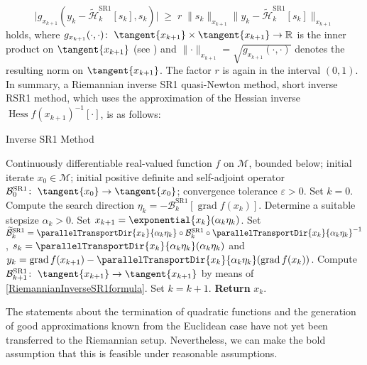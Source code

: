\begin{equation}\label{RiemannianCautiousSR1}
    \lvert g_{x_{k+1}}(y_k - \widetilde{\mathcal{H}}^\mathrm{SR1}_k [s_k], s_k) \lvert \; \geq \; r \; \lVert s_k \rVert_{x_{k+1}} \lVert y_k - \widetilde{\mathcal{H}}^\mathrm{SR1}_k [s_k] \rVert_{x_{k+1}} 
\end{equation}
holds, where $g_{x_{k+1}}(\cdot, \cdot) \colon \; \tangent{x_{k+1}} \times \tangent{x_{k+1}} \to \mathbb{R}$ is the inner product on $\tangent{x_{k+1}}$ (see \cite[p.~6]{BergmannHerzogLouzeiroSilvaTenbrinckVidalNunez:2020:1}) and $ \lVert \cdot \rVert_{x_{k+1}} = \sqrt{g_{x_{k+1}}(\cdot, \cdot)}$ denotes the resulting norm on $\tangent{x_{k+1}}$. The factor $r$ is again in the interval $(0,1)$. \\
In summary, a Riemannian inverse SR1 quasi-Newton method, short inverse RSR1 method, which uses the approximation of the Hessian inverse ${\operatorname{Hess} f(x_{k+1})}^{-1} [\cdot]$, is as follows:
\begin{algorithm}[H]
    \caption{Inverse SR1 Method}\label{RiemannianSR1Method}
    \begin{algorithmic}[1]
        \State Continuously differentiable real-valued function $f$ on $\mathcal{M}$, bounded below; initial iterate $x_0 \in \mathcal{M}$; initial positive definite and self-adjoint operator $\mathcal{B}^{\mathrm{SR1}}_0 \colon \; \tangent{x_0} \to \tangent{x_0}$; convergence tolerance $\varepsilon > 0$. Set $k = 0$.
            \State Compute the search direction $\eta_k = - \mathcal{B}^{\mathrm{SR1}}_k [\operatorname{grad} f(x_k)]$.
            \State Determine a suitable stepsize $\alpha_k > 0$. 
            \State Set $x_{k+1} = \exponential{x_k} (\alpha_k \eta_k)$.
            \State Set $\widetilde{\mathcal{B}}^{\mathrm{SR1}}_k = \parallelTransportDir{x_k}{\alpha_k \eta_k} \circ \mathcal{B}^{\mathrm{SR1}}_k \circ {\parallelTransportDir{x_k}{\alpha_k \eta_k}}^{-1}$, $s_k = \parallelTransportDir{x_k}{\alpha_k \eta_k} (\alpha_k \eta_k)$ and 
            \StatexIndent[2] $y_k = \operatorname{grad} f(x_{k+1}) - \parallelTransportDir{x_k}{\alpha_k \eta_k} (\operatorname{grad} f(x_k))$.
            \State Compute $\mathcal{B}^{\mathrm{SR1}}_{k+1} \colon \; \tangent{x_{k+1}} \to \tangent{x_{k+1}}$ by means of \cref{RiemannianInverseSR1formula}. 
            \State Set $k = k+1$.
        \EndWhile
        \State \textbf{Return} $x_k$.
    \end{algorithmic}
\end{algorithm}
The statements about the termination of quadratic functions and the generation of good approximations known from the Euclidean case have not yet been transferred to the Riemannian setup. Nevertheless, we can make the bold assumption that this is feasible under reasonable assumptions.  